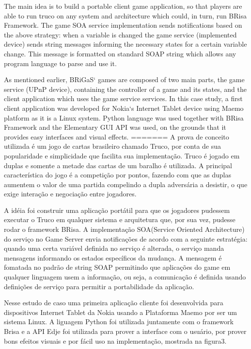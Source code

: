 \documentclass[a4paper]{sbgames}               %
\begin{document}
The main idea is to build a portable client game application, so that players are able to run truco on any system and architecture which could, in turn, run BRisa Framework. The game SOA service implementation sends notifications based on the above strategy: when a variable is changed the game service (implemented device) sends string messages informing the necessary states for a certain variable change. This message is formatted on standard SOAP string which allows any program language to parse and use it.

As mentioned earlier, BRiGaS` games are composed of two main parts, the game service (UPnP device), containing the controller of a game and its states, and the client application which uses the game service services. In this case study, a first client application was developed for Nokia`s Internet Tablet device using Maemo platform as it is a Linux system. Python language was used together with BRisa Framework and the Elementary GUI API was used, on the grounds that it provides easy interfaces and visual effects.
=======
A prova de conceito utilizada é um jogo de cartas brasileiro chamado Truco, por conta de sua popularidade e simplicidade que facilita sua implementação.  Truco é jogado em duplas e somente a metade das cartas de um baralho é utilizada. A principal característica do jogo é a competição por pontos, fazendo com que as duplas aumentem o valor de uma partida compelindo a dupla adversária a desistir, o que exige interação e negociação entre jogadores. 

A idéia foi construir uma aplicação portátil para que os jogadores pudessem executar o Truco em qualquer sistema e arquitetura que, por sua vez, pudesse rodar o framework BRisa. A implementação SOA(Service Oriented Architecture) do serviço no Game Server envia notificações de acordo com a seguinte estratégia: quando uma certa variável definida no serviço é alterada, o serviço manda mensagens informando os estados específicos da mudança. A mensagem é fomatada no padrão de string SOAP permitindo que aplicações do game em qualquer linguagem usem a informação, ou seja, a comunicação é definida usando definições de serviço para permitir a portabilidade da aplicação.

Nesse estudo de caso uma primeira aplicação cliente foi desenvolvida para dispositivos Internet Tablet da Nokia usando a Plataforma Maemo por ser um sistema Linux. A liguagem Python foi utilizada juntamente com o framework Brisa e a API Edje foi utilizada para prover a interface com o usuário, por prover bons efeitos visuais e por fácil uso na implementação, mostrada na figura3.
\end{document}
